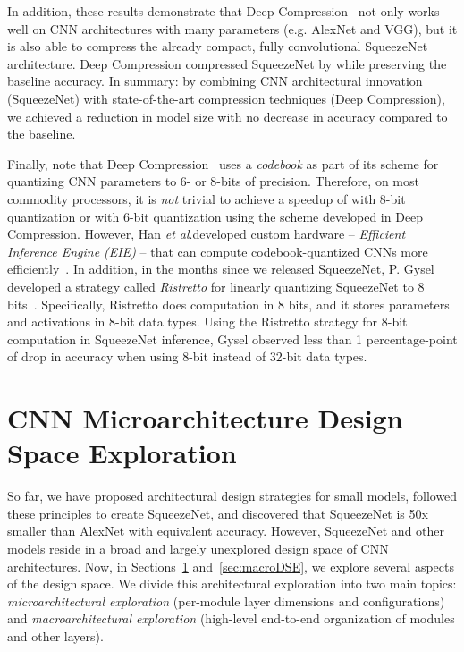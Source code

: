 \documentclass{article} \usepackage{iclr2017_conference,times}
\newcommand{\etal}{\textit{et al}.}
\renewcommand{\cite}{\citep}
\def\vsp{\vspace{-0.15in}}
\begin{document}
In addition, these results demonstrate that Deep Compression~\cite{dally2015-2} not only works well on CNN architectures with many parameters (e.g. AlexNet and VGG), but it is also able to compress the already compact, fully convolutional SqueezeNet architecture. 
Deep Compression compressed SqueezeNet by  while preserving the baseline accuracy.
In summary: by combining CNN architectural innovation (SqueezeNet) with state-of-the-art compression techniques (Deep Compression), we achieved a  reduction in model size with no decrease in accuracy compared to the baseline.

Finally, note that Deep Compression~\cite{dally2015-1} uses a {\em codebook} as part of its scheme for quantizing CNN parameters to 6- or 8-bits of precision.
Therefore, on most commodity processors, it is {\em not} trivial to achieve a speedup of  with 8-bit quantization or  with 6-bit quantization using the scheme developed in Deep Compression.
However, Han \etal developed custom hardware -- {\em Efficient Inference Engine (EIE)} -- that can compute codebook-quantized CNNs more efficiently~\cite{EIE}.
In addition, in the months since we released SqueezeNet, P. Gysel developed a strategy called {\em Ristretto} for linearly quantizing SqueezeNet to 8 bits~\cite{Ristretto}.
Specifically, Ristretto does computation in 8 bits, and it stores parameters and activations in 8-bit data types.
Using the Ristretto strategy for 8-bit computation in SqueezeNet inference, Gysel observed less than 1 percentage-point of drop in accuracy when using 8-bit instead of 32-bit data types.


\section{CNN Microarchitecture Design Space Exploration}
\label{sec:microDSE}
\vsp

So far, we have proposed architectural design strategies for small models, followed these principles to create SqueezeNet, and discovered that SqueezeNet is 50x smaller than AlexNet with equivalent accuracy.
However, SqueezeNet and other models reside in a broad and largely unexplored design space of CNN architectures.
Now, in Sections~\ref{sec:microDSE} and~\ref{sec:macroDSE}, we explore several aspects of the design space. We divide this architectural exploration into two main topics: {\em microarchitectural exploration} (per-module layer dimensions and configurations) and {\em macroarchitectural exploration} (high-level end-to-end organization of modules and other layers). 
\end{document}
